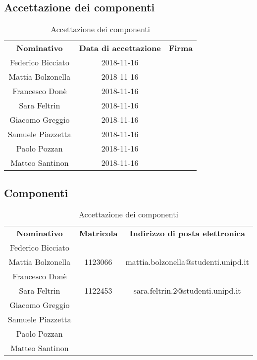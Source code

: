\subsection{Accettazione dei componenti}
\begin{table}[H]
	\centering\renewcommand{\arraystretch}{1.5}
	\begin{tabular}{c|c|c}
		\hline
		
		\rowcolorhead 
		{ \textbf{Nominativo}} &
		{ \textbf{Data di accettazione}} &
		{ \textbf{Firma}}  \\
		
		\rowcolorlight
		Federico Bicciato & 2018-11-16 &   \\ \hline
		\rowcolordark
		Mattia Bolzonella & 2018-11-16 &   \\ \hline
		\rowcolorlight
		Francesco Donè & 2018-11-16 &   \\ \hline
		\rowcolordark
		Sara Feltrin & 2018-11-16 &   \\ \hline
		\rowcolorlight
		Giacomo Greggio & 2018-11-16 &   \\ \hline
		\rowcolordark
		Samuele Piazzetta & 2018-11-16 &   \\ \hline
		\rowcolorlight
		Paolo Pozzan & 2018-11-16 &   \\ \hline
		\rowcolordark
		Matteo Santinon & 2018-11-16 &   \\ \hline
	\end{tabular}
	\caption{Accettazione dei componenti}
\end{table}

\subsection{Componenti}
\begin{table}[H]
	\centering\renewcommand{\arraystretch}{1.5}
	\begin{tabular}{c|c|c}
		\hline
		
		\rowcolorhead 
		{ \textbf{Nominativo}} &
		{ \textbf{Matricola}} &
		{ \textbf{Indirizzo di posta elettronica}}  \\
		
		\rowcolorlight
		Federico Bicciato &  &   \\ \hline
		\rowcolordark
		Mattia Bolzonella & 1123066 & mattia.bolzonella@studenti.unipd.it  \\ \hline
		\rowcolorlight
		Francesco Donè &  &   \\ \hline
		\rowcolordark
		Sara Feltrin & 1122453 &  sara.feltrin.2@studenti.unipd.it \\ \hline
		\rowcolorlight
		Giacomo Greggio &  &   \\ \hline
		\rowcolordark
		Samuele Piazzetta &  &   \\ \hline
		\rowcolorlight
		Paolo Pozzan &  &   \\ \hline
		\rowcolordark
		Matteo Santinon &  &   \\ \hline
	\end{tabular}
	\caption{Accettazione dei componenti}
\end{table}

